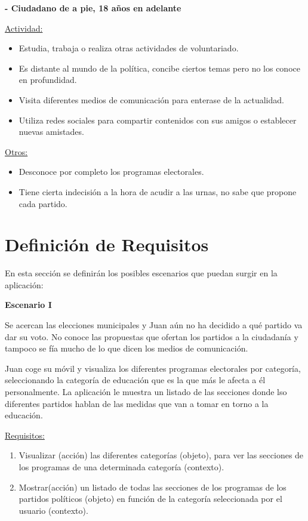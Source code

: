 \textbf{- Ciudadano de a pie, 18 años en adelante}

\underline{Actividad:}

\begin{itemize}
\item Estudia, trabaja o realiza otras actividades de voluntariado.
\item Es distante al mundo de la política, concibe ciertos temas pero no los conoce en profundidad.
\item Visita diferentes medios de comunicación para enterase de la actualidad.
\item Utiliza redes sociales para compartir contenidos con sus amigos o establecer nuevas amistades.
\end{itemize}

\underline{Otros:}

\begin{itemize}
\item Desconoce por completo los programas electorales. 
\item Tiene cierta indecisión a la hora de acudir a las urnas, no sabe que propone cada partido.
\end{itemize}

\section{Definición de Requisitos}
En esta sección se definirán los posibles escenarios que puedan surgir en la aplicación:

\textbf{Escenario I}

Se acercan las elecciones municipales y Juan aún no ha decidido a qué partido va dar su voto. No conoce las propuestas que ofertan los partidos a la ciudadanía y tampoco se fía mucho de lo que dicen los medios de comunicación.

Juan coge su móvil y visualiza los diferentes programas electorales por categoría, seleccionando la categoría de educación que es la que más le afecta a él personalmente. La aplicación le muestra un listado de las secciones donde lso diferentes partidos hablan de las medidas que van a tomar en torno a la educación.

\underline{Requisitos:}

\begin{enumerate}
\item Visualizar (acción) las diferentes categorías (objeto), para ver las secciones de los programas de una determinada categoría (contexto).
\item Mostrar(acción) un listado de todas las secciones de los programas de los partidos  políticos (objeto) en función de la categoría seleccionada por el usuario (contexto).
\end{enumerate}

